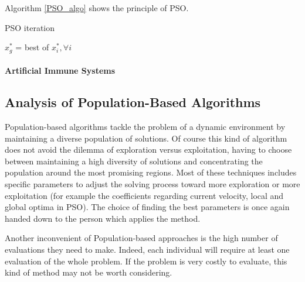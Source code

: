 Algorithm \ref{PSO_algo} shows the principle of PSO.

\begin{algorithm}
\caption{PSO iteration}\label{PSO_algo}

	$x_g^*$ = best of $x_i^*, \forall i$\;

\end{algorithm}

%
%

\paragraph*{Artificial Immune Systems}

\subsection{Analysis of Population-Based Algorithms}

Population-based algorithms tackle the problem of a dynamic environment by maintaining a diverse population of solutions. Of course this kind of algorithm does not avoid the dilemma of exploration versus exploitation, having to choose between maintaining a high diversity of solutions and concentrating the population around the most promising regions. Most of these techniques includes specific parameters to adjust the solving process toward more exploration or more exploitation (for example the coefficients regarding current velocity, local and global optima in PSO). The choice of finding the best parameters is once again handed down to the person which applies the method.

Another inconvenient of Population-based approaches is the high number of evaluations they need to make. Indeed, each individual will require at least one evaluation of the whole problem. If the problem is very costly to evaluate, this kind of method may not be worth considering.

